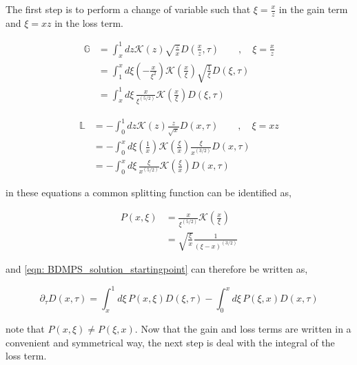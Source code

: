 \documentclass[main.tex]{subfiles}
\begin{document}
The first step is to perform a change of variable such that \(\xi = \frac{x}{z}\) in the gain term and \(\xi = xz\) in the loss term. 

\begin{align}\label{eqn: BDMPS_solution_gainterm_changeofvariable}
    \mathbb{G} &= \int_x^1 dz \mathcal{K}(z) \sqrt{\frac{z}{x}} D(\frac{x}{z}, \tau) \qquad,\quad \xi = \frac{x}{z} \nonumber \\
    &= \int_1^x d\xi (-\frac{x}{\xi^2}) \mathcal{K}(\frac{x}{\xi}) \sqrt{\frac{1}{\xi}} D(\xi, \tau) \nonumber \\
    &= \int_x^1 d\xi \,\frac{x}{\xi^(5/2)} \mathcal{K}(\frac{x}{\xi}) D(\xi, \tau)
\end{align}


\begin{align}\label{eqn: BDMPS_solution_lossterm_changeofvariable}
    \mathbb{L} &= - \int_0^1 dz \mathcal{K}(z) \frac{z}{\sqrt{x}} D(x,\tau)\qquad , \quad \xi = xz \nonumber \\
    &= - \int_0^x d\xi (\frac{1}{x}) \mathcal{K}(\frac{\xi}{x}) \frac{\xi}{x^(3/2)} D(x,\tau) \nonumber \\
    &= - \int_0^x d\xi \,\frac{\xi}{x^(5/2)} \mathcal{K}(\frac{\xi}{x}) D(x,\tau)
\end{align}

in these equations a common splitting function can be identified as, 

\begin{align}\label{eqn: BDMPS_solution_splittingfunction_xivariable}
    P(x,\xi) &= \frac{x}{\xi^(5/2)} \mathcal{K}(\frac{x}{\xi}) \nonumber \\
    &= \sqrt{\frac{\xi}{x}} \frac{1}{(\xi-x)^{(3/2)}}
\end{align}

and \autoref{eqn: BDMPS_solution_startingpoint} can therefore be written as, 

\begin{equation}\label{eqn: BDMPS_solution_evoleqn_with_xisplitfunc}
    \partial_\tau D(x,\tau) = \int_x^1 d\xi \,P(x,\xi) D(\xi, \tau) - \int_0^x d\xi \,P(\xi,x) D(x,\tau)
\end{equation}

note that \(P(x,\xi) \neq P(\xi, x)\). 
Now that the gain and loss terms are written in a convenient and symmetrical way, the next step is deal with the integral of the loss term.
\end{document}
